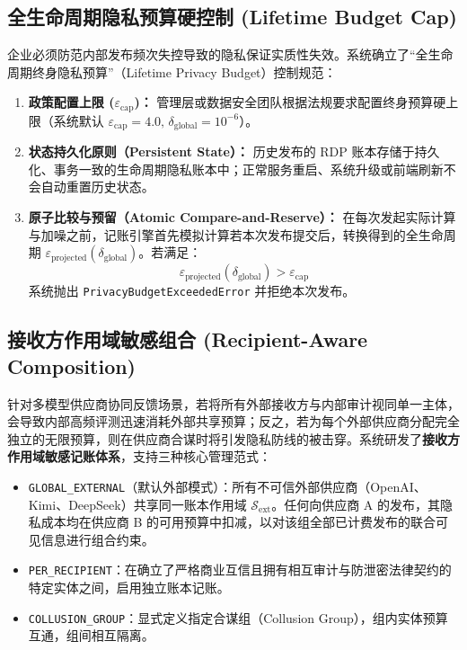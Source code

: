 \subsection{全生命周期隐私预算硬控制 (Lifetime Budget Cap)}
企业必须防范内部发布频次失控导致的隐私保证实质性失效。系统确立了“全生命周期终身隐私预算”（Lifetime Privacy Budget）控制规范：
\begin{enumerate}[label=(\alph*), leftmargin=2.5em]
  \item \textbf{政策配置上限 ($\varepsilon_{\text{cap}}$)：} 管理层或数据安全团队根据法规要求配置终身预算硬上限（系统默认 $\varepsilon_{\text{cap}} = 4.0, \, \delta_{\text{global}} = 10^{-6}$）。
  \item \textbf{状态持久化原则（Persistent State）：} 历史发布的 RDP 账本存储于持久化、事务一致的生命周期隐私账本中；正常服务重启、系统升级或前端刷新不会自动重置历史状态。
  \item \textbf{原子比较与预留（Atomic Compare-and-Reserve）：} 在每次发起实际计算与加噪之前，记账引擎首先模拟计算若本次发布提交后，转换得到的全生命周期 $\varepsilon_{\text{projected}}(\delta_{\text{global}})$。若满足：
    \begin{equation}
      \varepsilon_{\text{projected}}(\delta_{\text{global}}) > \varepsilon_{\text{cap}}
    \end{equation}
    系统抛出 \texttt{PrivacyBudgetExceededError} 并拒绝本次发布。
\end{enumerate}

\subsection{接收方作用域敏感组合 (Recipient-Aware Composition)}
针对多模型供应商协同反馈场景，若将所有外部接收方与内部审计视同单一主体，会导致内部高频评测迅速消耗外部共享预算；反之，若为每个外部供应商分配完全独立的无限预算，则在供应商合谋时将引发隐私防线的被击穿。系统研发了\textbf{接收方作用域敏感记账体系}，支持三种核心管理范式：
\begin{itemize}[leftmargin=2em]
  \item \texttt{GLOBAL\_}\allowbreak\texttt{EXTERNAL}（默认外部模式）：所有不可信外部供应商（OpenAI、Kimi、DeepSeek）共享同一账本作用域 $\mathcal{S}_{\text{ext}}$。任何向供应商 A 的发布，其隐私成本均在供应商 B 的可用预算中扣减，以对该组全部已计费发布的联合可见信息进行组合约束。
  \item \texttt{PER\_RECIPIENT}：在确立了严格商业互信且拥有相互审计与防泄密法律契约的特定实体之间，启用独立账本记账。
  \item \texttt{COLLUSION\_GROUP}：显式定义指定合谋组（Collusion Group），组内实体预算互通，组间相互隔离。
\end{itemize}

